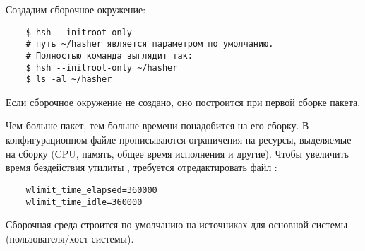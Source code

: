 Создадим сборочное окружение: 
\begin{verbatim}
	$ hsh --initroot-only 
	# путь ~/hasher является параметром по умолчанию. 
	# Полностью команда выглядит так:
	$ hsh --initroot-only ~/hasher
	$ ls -al ~/hasher
\end{verbatim}

Если сборочное окружение не создано, оно построится при первой сборке пакета. 

Чем больше пакет, тем больше времени понадобится на его сборку. 
В конфигурационном файле  прописываются ограничения на ресурсы, 
выделяемые на сборку (CPU, память, общее время исполнения и другие). Чтобы 
увеличить время бездействия утилиты , требуется отредактировать 
файл :
\begin{verbatim}
	wlimit_time_elapsed=360000
	wlimit_time_idle=360000
\end{verbatim} 

Сборочная среда строится по умолчанию на источниках для основной системы 
(пользователя/хост-системы).


